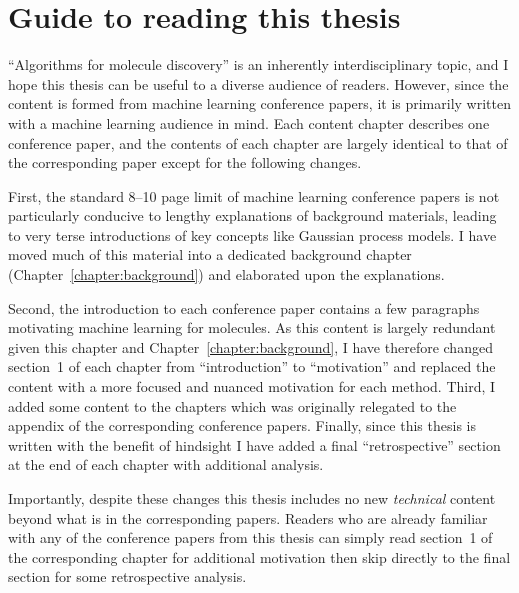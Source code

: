 \section{Guide to reading this thesis}

``Algorithms for molecule discovery'' is an inherently interdisciplinary topic,
and I hope this thesis can be useful to a diverse audience of readers.
However, since the content is formed from machine learning conference papers,
it is primarily written with a machine learning audience in mind.
Each content chapter describes one conference paper,
and the contents of each chapter are largely identical to that of the corresponding paper
except for the following changes.

First, the standard 8--10 page limit of machine learning conference papers is not particularly conducive
to lengthy explanations of background materials, leading to very terse introductions of key concepts
like Gaussian process models.
I have moved much of this material into a dedicated background chapter (Chapter~\ref{chapter:background})
and elaborated upon the explanations.

Second, the introduction to each conference paper contains a few paragraphs motivating machine learning for molecules.
As this content is largely redundant given this chapter and Chapter~\ref{chapter:background},
I have therefore changed section~1 of each chapter from ``introduction'' to ``motivation''
and replaced the content with a more focused and nuanced motivation for each method.
Third, I added some content to the chapters which was originally relegated to the appendix of the corresponding conference papers.
Finally, since this thesis is written with the benefit of hindsight I have added a final ``retrospective''
section at the end of each chapter with additional analysis.

Importantly, despite these changes this thesis includes no new \emph{technical} content
beyond what is in the corresponding papers.
Readers who are already familiar with any of the conference papers from this thesis can
simply read section~1
of the corresponding chapter for additional motivation
then skip directly to the final section for some retrospective analysis.
